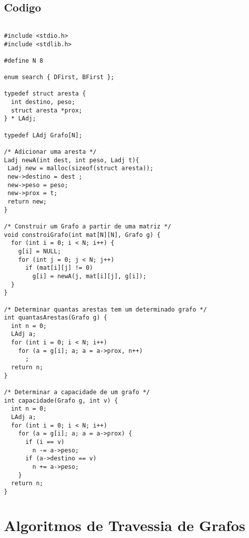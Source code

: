 \documentclass[11pt]{article}
\begin{document}
\subsection{Codigo}
\label{sec:orga1b8157}
\begin{verbatim}

#include <stdio.h>
#include <stdlib.h>

#define N 8

enum search { DFirst, BFirst };

typedef struct aresta {
  int destino, peso;
  struct aresta *prox;
} * LAdj;

typedef LAdj Grafo[N];

/* Adicionar uma aresta */
Ladj newA(int dest, int peso, Ladj t){
 Ladj new = malloc(sizeof(struct aresta));
 new->destino = dest ; 
 new->peso = peso;
 new->prox = t; 
 return new;
}

/* Construir um Grafo a partir de uma matriz */
void constroiGrafo(int mat[N][N], Grafo g) {
  for (int i = 0; i < N; i++) {
    g[i] = NULL;
    for (int j = 0; j < N; j++)
      if (mat[i][j] != 0)
        g[i] = newA(j, mat[i][j], g[i]);
  }
}

/* Determinar quantas arestas tem um determinado grafo */
int quantasArestas(Grafo g) {
  int n = 0;
  LAdj a;
  for (int i = 0; i < N; i++)
    for (a = g[i]; a; a = a->prox, n++)
      ;
  return n;
}

/* Determinar a capacidade de um grafo */
int capacidade(Grafo g, int v) {
  int n = 0;
  LAdj a;
  for (int i = 0; i < N; i++)
    for (a = g[i]; a; a = a->prox) {
      if (i == v)
        n -= a->peso;
      if (a->destino == v)
        n += a->peso;
    }
  return n;
}
\end{verbatim}
\section{Algoritmos de Travessia de Grafos}
\label{sec:org537828a}
\end{document}
